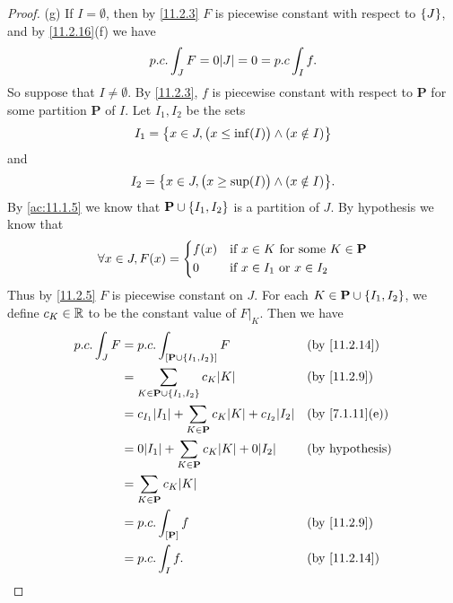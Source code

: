 \begin{proof}{(g)}
  If \(I = \emptyset\), then by \cref{11.2.3} \(F\) is piecewise constant with respect to \(\left\lbrace J\right\rbrace\), and by \cref{11.2.16}(f) we have
  \[
    p.c. \int_J F = 0 \abs{J} = 0 = p.c \int_I f.
  \]
  So suppose that \(I \neq \emptyset\).
  By \cref{11.2.3}, \(f\) is piecewise constant with respect to \(\mathbf{P}\) for some partition \(\mathbf{P}\) of \(I\).
  Let \(I_1, I_2\) be the sets
  \[
    I_1 = \left\lbrace x \in J, \big(x \leq \inf(I)\big) \land (x \notin I)\right\rbrace
  \]
  and
  \[
    I_2 = \set{x \in J, \big(x \geq \sup(I)\big) \land (x \notin I)}.
  \]
  By \cref{ac:11.1.5} we know that \(\mathbf{P} \cup \left\lbrace I_1, I_2\right\rbrace\) is a partition of \(J\).
  By hypothesis we know that
  \[
    \forall x \in J, F(x) = \begin{dcases}
      f(x) & \text{if } x \in K \text{ for some } K \in \mathbf{P} \\
      0    & \text{if } x \in I_1 \text{ or } x \in I_2
    \end{dcases}
  \]
  Thus by \cref{11.2.5} \(F\) is piecewise constant on \(J\).
  For each \(K \in \mathbf{P} \cup \left\lbrace I_1, I_2\right\rbrace\), we define \(c_K \in \mathbb{R}\) to be the constant value of \(F|_K\).
  Then we have
  \begin{align*}
    p.c. \int_J F & = p.c. \int_{[\mathbf{P} \cup \set{I_1, I_2}]} F                              &  & \by{11.2.14}                 \\
                  & = \sum_{K \in \mathbf{P} \cup \set{I_1, I_2}} c_K \abs{K}                     &  & \by{11.2.9}                  \\
                  & = c_{I_1} \abs{I_1} + \sum_{K \in \mathbf{P}} c_K \abs{K} + c_{I_2} \abs{I_2} &  & \text{(by \cref{7.1.11}(e))} \\
                  & = 0 \abs{I_1} + \sum_{K \in \mathbf{P}} c_K \abs{K} + 0 \abs{I_2}             &  & \text{(by hypothesis)}       \\
                  & = \sum_{K \in \mathbf{P}} c_K \abs{K}                                                                           \\
                  & = p.c. \int_{[\mathbf{P}]} f                                                  &  & \by{11.2.9}                  \\
                  & = p.c. \int_I f.                                                              &  & \by{11.2.14}
  \end{align*}
\end{proof}

